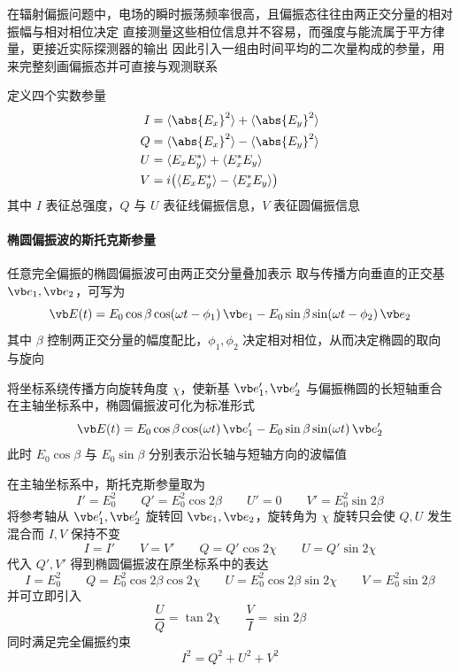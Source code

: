 
在辐射偏振问题中，电场的瞬时振荡频率很高，且偏振态往往由两正交分量的相对振幅与相对相位决定  
直接测量这些相位信息并不容易，而强度与能流属于平方律量，更接近实际探测器的输出  
因此引入一组由时间平均的二次量构成的参量，用来完整刻画偏振态并可直接与观测联系
\begin{definition}[斯托克斯参量]
定义四个实数参量
\begin{equation}
\begin{aligned}
I &= \langle \abs{E_x}^2\rangle + \langle \abs{E_y}^2\rangle \\
Q &= \langle \abs{E_x}^2\rangle - \langle \abs{E_y}^2\rangle \\
U &= \langle E_x E_y^*\rangle + \langle E_x^* E_y\rangle \\
V &= i\bigl(\langle E_x E_y^*\rangle - \langle E_x^* E_y\rangle\bigr)
\end{aligned}
\end{equation}
其中 $I$ 表征总强度，$Q$ 与 $U$ 表征线偏振信息，$V$ 表征圆偏振信息
\end{definition}


\paragraph{椭圆偏振波的斯托克斯参量}

任意完全偏振的椭圆偏振波可由两正交分量叠加表示  
取与传播方向垂直的正交基 $\vb e_1,\vb e_2$，可写为
\[
\vb E(t)=E_0\cos\beta\cos(\omega t-\phi_1)\,\vb e_1 - E_0\sin\beta\sin(\omega t-\phi_2)\,\vb e_2
\]
其中 $\beta$ 控制两正交分量的幅度配比，$\phi_1,\phi_2$ 决定相对相位，从而决定椭圆的取向与旋向

将坐标系绕传播方向旋转角度 $\chi$，使新基 $\vb e_1',\vb e_2'$ 与偏振椭圆的长短轴重合  
在主轴坐标系中，椭圆偏振波可化为标准形式
\[
\vb E(t)=E_0\cos\beta\cos(\omega t)\,\vb e_1' - E_0\sin\beta\sin(\omega t)\,\vb e_2'
\]
此时 $E_0\cos\beta$ 与 $E_0\sin\beta$ 分别表示沿长轴与短轴方向的波幅值

在主轴坐标系中，斯托克斯参量取为
\[
I'=E_0^2
\qquad
Q'=E_0^2\cos2\beta
\qquad
U'=0
\qquad
V'=E_0^2\sin2\beta
\]
将参考轴从 $\vb e_1',\vb e_2'$ 旋转回 $\vb e_1,\vb e_2$，旋转角为 $\chi$  
旋转只会使 $Q,U$ 发生混合而 $I,V$ 保持不变
\[
I=I'
\qquad
V=V'
\qquad
Q=Q'\cos2\chi
\qquad
U=Q'\sin2\chi
\]
代入 $Q',V'$ 得到椭圆偏振波在原坐标系中的表达
\[
I=E_0^2
\qquad
Q=E_0^2\cos2\beta\cos2\chi
\qquad
U=E_0^2\cos2\beta\sin2\chi
\qquad
V=E_0^2\sin2\beta
\]
并可立即引入
\[
\frac{U}{Q}=\tan2\chi
\qquad
\frac{V}{I}=\sin2\beta
\]
同时满足完全偏振约束
\begin{equation}
I^2=Q^2+U^2+V^2
\end{equation}

